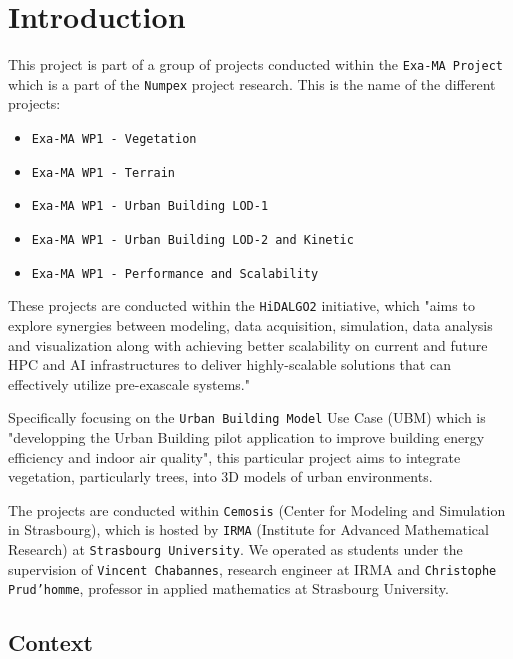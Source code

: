 \documentclass[12pt]{article}
\begin{document}
\tableofcontents

\newpage

\section{Introduction}

This project is part of a group of projects conducted within the \texttt{Exa-MA Project}
\cite{exaMA} which is a part of the \texttt{Numpex} project research\cite{numpex}. This 
is the name of the different projects:
\begin{itemize}
    \item \texttt{Exa-MA WP1 - Vegetation}
    \item \texttt{Exa-MA WP1 - Terrain}
    \item \texttt{Exa-MA WP1 - Urban Building LOD-1}
    \item \texttt{Exa-MA WP1 - Urban Building LOD-2 and Kinetic}
    \item \texttt{Exa-MA WP1 - Performance and Scalability}
\end{itemize}

These projects are conducted within the \texttt{HiDALGO2}\cite{hidalgo2} initiative, which
"aims to explore synergies between modeling, data acquisition, simulation,
data analysis and visualization along with achieving better scalability on
current and future HPC and AI infrastructures to deliver highly-scalable
solutions that can effectively utilize pre-exascale systems."\cite{hidalgo2-about}

Specifically focusing on the \texttt{Urban Building Model}\cite{hidalgo2-ubm}
Use Case (UBM) which is "developping the Urban Building pilot application to
improve building energy efficiency and indoor air quality"\cite{hidalgo2-ubm},
this particular project aims to integrate vegetation, particularly trees, into 3D models
of urban environments.

The projects are conducted within \texttt{Cemosis}\cite{cemosis} (Center for
Modeling and Simulation in Strasbourg), which is hosted by
\texttt{IRMA}\cite{irma} (Institute for Advanced Mathematical Research) at
\texttt{Strasbourg University}. We operated as students under the supervision of
 \texttt{Vincent Chabannes}\cite{chabannes}, research engineer at IRMA and 
 \texttt{Christophe Prud'homme}\cite{prudhomme}, professor in applied mathematics
  at Strasbourg University.

\subsection{Context}
\end{document}
